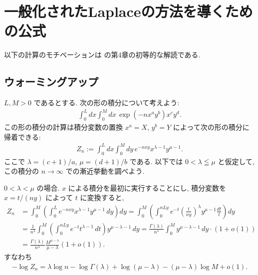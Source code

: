\documentclass[12pt,twoside]{jarticle}
\theoremstyle{jplain}
\theoremstyle{jplain}
\theoremstyle{jplain}
\numberwithin{theorem}{section}
\numberwithin{equation}{section}
\numberwithin{figure}{section}
\numberwithin{table}{section}
\begin{document}

\section{一般化されたLaplaceの方法を導くための公式}

以下の計算のモチベーションは \cite{watanabe-2012} の第4章の初等的な解読である.


\subsection{ウォーミングアップ}

$L,M>0$ であるとする.
次の形の積分について考えよう:
\begin{align*}
\int_0^L dx \int_0^M dx\, \exp\left(-n x^a y^b \right) x^c y^d.
\end{align*}
この形の積分の計算は積分変数の置換 $x^a=X$, $y^b=Y$ によって次の形の積分に帰着できる:
\begin{align*}
Z_n:=\int_0^L dx \int_0^M dy\, e^{-nxy} x^{\lambda-1} y^{\mu-1}.
\end{align*}
ここで $\lambda=(c+1)/a$, $\mu=(d+1)/b$ である.
以下では $0<\lambda\leqq\mu$ と仮定して, この積分の $n\to\infty$ での漸近挙動を調べよう.

$0<\lambda<\mu$ の場合.  $x$ による積分を最初に実行することにし, 
積分変数を $x=t/(ny)$ によって $t$ に変換すると,  
\begin{align*}
Z_n
&= \int_0^M \left(\int_0^L e^{-nxy} x^{\lambda-1}y^{\mu-1}\,dy\right)dy
=\int_0^M \left(\int_0^{nLy} e^{-t} \left(\frac{t}{ny}\right)^\lambda y^{\mu-1}\frac{dt}{t}\right)dy
\\ &
=\frac{1}{n^\lambda}\int_0^M \left(\int_0^{nLy} e^{-t} t^{\lambda-1}\,dt\right)y^{\mu-\lambda-1}\,dy
=\frac{\Gamma(\lambda)}{n^\lambda}\int_0^M y^{\mu-\lambda-1}\,dy\cdot(1+o(1))
\\ &
=\frac{\Gamma(\lambda)}{n^\lambda}\frac{M^{\mu-\lambda}}{\mu-\lambda}(1+o(1)).
\end{align*}
すなわち
\begin{align*}
-\log Z_n = \lambda\log n -\log\Gamma(\lambda)+ \log(\mu-\lambda)-(\mu-\lambda)\log M + o(1).
\end{align*}
\end{document}
